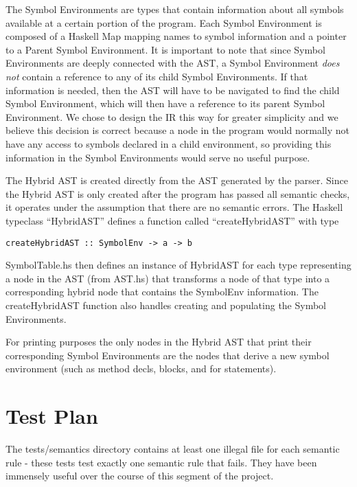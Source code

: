 \documentclass[11pt]{article}
\begin{document}
The Symbol Environments are types that contain information about all symbols available at a certain portion of the program. Each Symbol Environment is composed of a Haskell Map mapping names to symbol information and a pointer to a Parent Symbol Environment. It is important to note that since Symbol Environments are deeply connected with the AST, a Symbol Environment \emph{does not} contain a reference to any of its child Symbol Environments. If that information is needed, then the AST will have to be navigated to find the child Symbol Environment, which will then have a reference to its parent Symbol Environment. We chose to design the IR this way for greater simplicity and we believe this decision is correct because a node in the program would normally not have any access to symbols declared in a child environment, so providing this information in the Symbol Environments would serve no useful purpose. 

The Hybrid AST is created directly from the AST generated by the parser. Since the Hybrid AST is only created after the program has passed all semantic checks, it operates under the assumption that there are no semantic errors. The Haskell typeclass ``HybridAST'' defines a function called ``createHybridAST'' with type 
\begin{verbatim}
createHybridAST :: SymbolEnv -> a -> b
\end{verbatim} 

SymbolTable.hs then defines an instance of HybridAST for each type representing a node in the AST (from AST.hs) that transforms a node of that type into a corresponding hybrid node that contains the SymbolEnv information. The createHybridAST function also handles creating and populating the Symbol Environments.

For printing purposes the only nodes in the Hybrid AST that print their corresponding Symbol Environments are the nodes that derive a new symbol environment (such as method decls, blocks, and for statements). 

\section{Test Plan}
\label{sec:test}
The tests/semantics directory contains at least one illegal file for each semantic rule - these tests test exactly one semantic rule that fails. They have been immensely useful over the course of this segment of the project.
\end{document}
